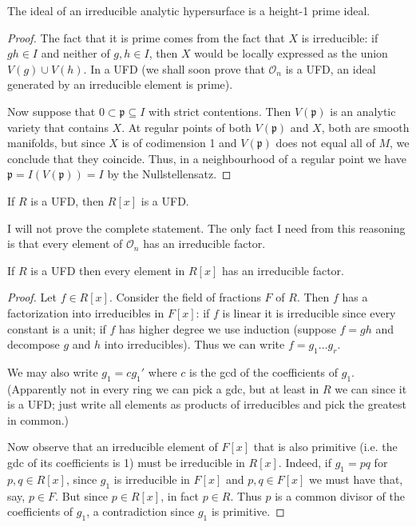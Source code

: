 \begin{lemma}
\label{lemma-ideal-of-irreducible-hypersurface-is-height-1-prime}
The ideal of an irreducible analytic hypersurface is a height-1 prime ideal.
\end{lemma}

\begin{proof} 
The fact that it is prime comes from the fact that $X$ is
irreducible: if $gh \in I$ and neither of $g,h \in I$, then $X$ would be locally
expressed as the union $V(g) \cup  V(h)$. In a UFD (we shall soon prove that
$\mathcal{O}_n$ is a UFD, an ideal generated by an irreducible element is
prime).

Now suppose that $0 \subset \mathfrak{p} \subseteq I$ with strict
contentions. Then $V(\mathfrak{p})$ is an analytic variety that contains $X$.
At regular points of both $V(\mathfrak{p})$ and $X$, 
both are smooth manifolds, but since $X$ is of codimension 1 and 
$V(\mathfrak{p})$ does not equal all of  $M$, 
we conclude that they coincide. 
Thus, in a neighbourhood
of a regular point we have $\mathfrak{p}=I(V(\mathfrak{p}))=I$ by the
Nullstellensatz.
\end{proof}

\begin{lemma}
\label{lemma-Gauss-UFD}
If $R$ is a UFD, then $R[x]$ is a UFD.
\end{lemma}

I will not prove the complete statement. The only fact I need from this
reasoning is that every element of $\mathcal{O}_n$ has an irreducible factor.

\begin{lemma}
\label{lemma-polynomials-over-UFD-have-irreducible-factor}
If $R$ is a UFD then every element in $R[x]$ has an irreducible factor.
\end{lemma}

\begin{proof}
Let $f\in R[x]$. Consider the field of fractions $F$ of $R$. Then $f$ has a
factorization into irreducibles in $F[x]$: if $f$
is linear it is irreducible since every constant is a unit; if $f$ has higher
degree we use induction (suppose $f=gh$ and decompose $g$ and $h$ into
irreducibles). Thus we can write $f=g_1\ldots g_r$.

We may also write $g_1=cg_1'$ where $c$ is the gcd of the coefficients of $g_1$.
(Apparently not in every ring we can pick a gdc, but at least in $R$ we can
since it is a UFD; just write all elements as products of irreducibles and pick
the greatest in common.)

Now observe that an irreducible element of $F[x]$ that is also primitive (i.e.
the gdc of its coefficients is 1) must be irreducible in $R[x]$. Indeed, if
$g_1=pq$ for $p,q \in R[x]$, since $g_1$ is irreducible in $F[x]$ and  $p,q \in
F[x]$ we must have that, say, $p \in F$. But since $p \in R[x]$, in fact $p\in
R$. Thus $p$ is a common divisor of the coefficients of $g_1$, a contradiction
since $g_1$ is primitive.
\end{proof}

